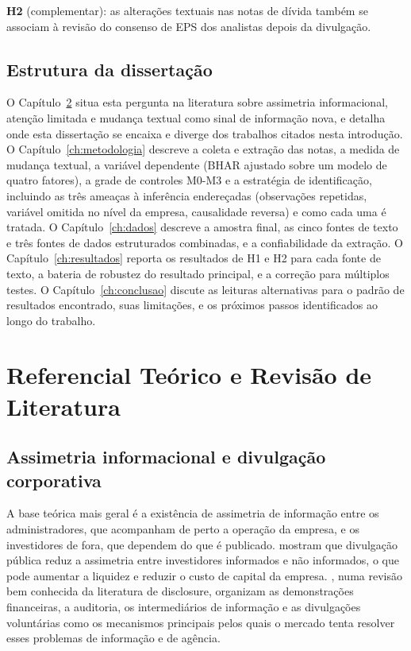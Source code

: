 \documentclass[a4paper,12pt]{report}
\begin{document}
\textbf{H2} (complementar): as alterações textuais nas notas de dívida também se associam à revisão do consenso de EPS dos analistas depois da divulgação.

\section{Estrutura da dissertação}

O Capítulo~\ref{ch:referencial} situa esta pergunta na literatura sobre assimetria informacional, atenção limitada e mudança textual como sinal de informação nova, e detalha onde esta dissertação se encaixa e diverge dos trabalhos citados nesta introdução. O Capítulo~\ref{ch:metodologia} descreve a coleta e extração das notas, a medida de mudança textual, a variável dependente (BHAR ajustado sobre um modelo de quatro fatores), a grade de controles M0-M3 e a estratégia de identificação, incluindo as três ameaças à inferência endereçadas (observações repetidas, variável omitida no nível da empresa, causalidade reversa) e como cada uma é tratada. O Capítulo~\ref{ch:dados} descreve a amostra final, as cinco fontes de texto e três fontes de dados estruturados combinadas, e a confiabilidade da extração. O Capítulo~\ref{ch:resultados} reporta os resultados de H1 e H2 para cada fonte de texto, a bateria de robustez do resultado principal, e a correção para múltiplos testes. O Capítulo~\ref{ch:conclusao} discute as leituras alternativas para o padrão de resultados encontrado, suas limitações, e os próximos passos identificados ao longo do trabalho.

\chapter{Referencial Teórico e Revisão de Literatura}
\label{ch:referencial}

\section{Assimetria informacional e divulgação corporativa}

A base teórica mais geral é a existência de assimetria de informação entre os administradores, que acompanham de perto a operação da empresa, e os investidores de fora, que dependem do que é publicado.  mostram que divulgação pública reduz a assimetria entre investidores informados e não informados, o que pode aumentar a liquidez e reduzir o custo de capital da empresa. , numa revisão bem conhecida da literatura de disclosure, organizam as demonstrações financeiras, a auditoria, os intermediários de informação e as divulgações voluntárias como os mecanismos principais pelos quais o mercado tenta resolver esses problemas de informação e de agência.
\end{document}
